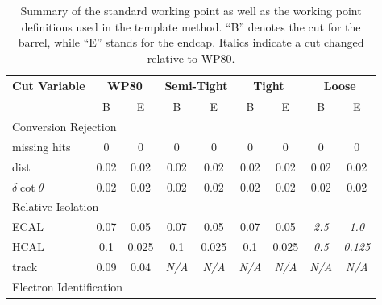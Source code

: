\begin{table}[htbp]
  \begin{center}
    \caption[Summary of the standard working point and 
      the working points used in the template method.]
    {\fixspacing 
      Summary of the standard working point as well as 
      the working point definitions used 
      in the template method.
      ``B'' denotes the cut for the barrel, 
      while ``E'' stands for the endcap.  
      Italics indicate a cut changed relative to WP80.
    }
    \label{TableWPs}
    \begin{tabular}[]{ | l | c | c | c | c | c | c | c | c | }
      \hline
      Cut Variable & \multicolumn{2}{|c|}{WP80} & \multicolumn{2}{|c|}{Semi-Tight} & \multicolumn{2}{|c|}{Tight} & \multicolumn{2}{|c|}{Loose}  \\ \hline \hline
      & B & E & B & E & B & E & B & E \\ \hline
      \multicolumn{9}{|l|}{Conversion Rejection}   \\ \hline %
      missing hits            & 0    & 0    & 0    & 0    & 0    & 0    & 0    & 0     \\ \hline %
      dist                    & 0.02 & 0.02 & 0.02 & 0.02 & 0.02 & 0.02 & 0.02 & 0.02  \\ \hline %
      $\delta\cot\theta$      & 0.02 & 0.02 & 0.02 & 0.02 & 0.02 & 0.02 & 0.02 & 0.02  \\ \hline %
      \multicolumn{9}{|l|}{Relative Isolation}   \\ \hline %
      ECAL      & 0.07 & 0.05 & 0.07 & 0.05 & 0.07 & 0.05 & \textit{2.5} & \textit{1.0}  \\ \hline %
      HCAL      & 0.1 & 0.025 & 0.1 & 0.025 & 0.1 & 0.025 & \textit{0.5} & \textit{0.125}  \\ \hline %
      track     & 0.09 & 0.04 & \textit{N/A} & \textit{N/A} & \textit{N/A} & \textit{N/A} & \textit{N/A} & \textit{N/A}  \\ \hline %
      \multicolumn{9}{|l|}{Electron Identification}   \\ \hline %

\end{tabular}
\end{center}
\end{table}
